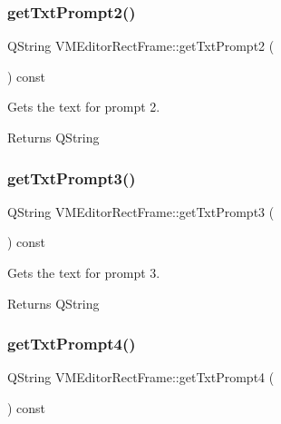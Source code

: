\subsubsection{\texorpdfstring{getTxtPrompt2()}{getTxtPrompt2()}}
{\footnotesize\ttfamily Q\+String V\+M\+Editor\+Rect\+Frame\+::get\+Txt\+Prompt2 (\begin{DoxyParamCaption}{ }\end{DoxyParamCaption}) const}



Gets the text for prompt 2. 

\begin{DoxyReturn}{Returns}
Q\+String 
\end{DoxyReturn}
\mbox{\label{class_v_m_editor_rect_frame_ac547d797a8f4309bc1f0ab97bfdc262f}} 
\subsubsection{\texorpdfstring{getTxtPrompt3()}{getTxtPrompt3()}}
{\footnotesize\ttfamily Q\+String V\+M\+Editor\+Rect\+Frame\+::get\+Txt\+Prompt3 (\begin{DoxyParamCaption}{ }\end{DoxyParamCaption}) const}



Gets the text for prompt 3. 

\begin{DoxyReturn}{Returns}
Q\+String 
\end{DoxyReturn}
\mbox{\label{class_v_m_editor_rect_frame_a6ae15857de45e5c9f239be713e744a2b}} 
\subsubsection{\texorpdfstring{getTxtPrompt4()}{getTxtPrompt4()}}
{\footnotesize\ttfamily Q\+String V\+M\+Editor\+Rect\+Frame\+::get\+Txt\+Prompt4 (\begin{DoxyParamCaption}{ }\end{DoxyParamCaption}) const}



